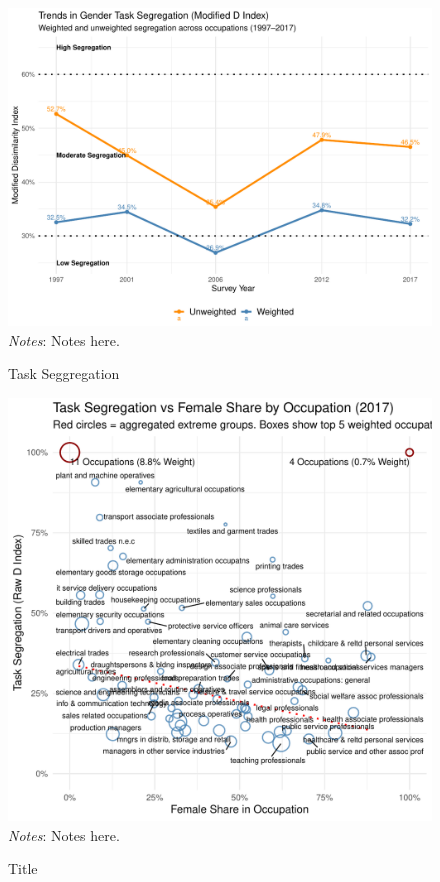 \begin{figure}[!t]
    \centering
    \caption{Task Seggregation}
    \includegraphics[width=\textwidth]{_graphic/task_segregation.pdf}
    \label{fig:task_segregation}
    \vspace{-3em}
    \justify\singlespacing\scriptsize\textit{Notes}: Notes here.
\end{figure}



\begin{figure}[!t]
    \centering
    \caption{Title}
    \includegraphics[width=\textwidth]{_graphic/task_b3occ_females_share_nobox.pdf}
    \label{fig:task_b3occ_females_share_nobox}
    \vspace{-3em}
    \justify\singlespacing\scriptsize\textit{Notes}: Notes here.
\end{figure}

